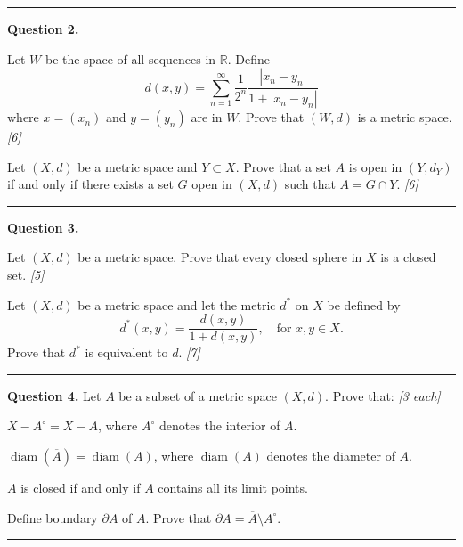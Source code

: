 \documentclass[11pt,a4paper]{article}
\newcommand{\pts}[1]{\hfill   \textit{[#1]}}
\begin{document}
\medskip\rule{\linewidth}{0.2pt}

\medskip


\noindent   \textbf{Question 2.}

\begin{parts}
  \item Let $W$ be the space of all sequences in $\mathbb{R}$. Define
  \[
  d(x, y) = \sum_{n=1}^\infty \frac{1}{2^n} \frac{|x_n - y_n|}{1 + |x_n - y_n|}
  \]
  where $x = (x_n)$ and $y = (y_n)$ are in $W$. Prove that $(W, d)$ is a metric space. \pts{6}
  \item Let $(X, d)$ be a metric space and $Y \subset X$. Prove that a set $A$ is open in $(Y, d_Y)$ if and only if there exists a set $G$ open in $(X, d)$ such that $A = G \cap Y$. \pts{6}
\end{parts}

\medskip\rule{\linewidth}{0.2pt}

\medskip


\noindent   \textbf{Question 3.}

\begin{parts}
  \item Let $(X, d)$ be a metric space. Prove that every closed sphere in $X$ is a closed set. \pts{5}
  \item Let $(X, d)$ be a metric space and let the metric $d^*$ on $X$ be defined by
  \[
  d^*(x, y) = \frac{d(x, y)}{1 + d(x, y)}, \quad  \text{for } x, y \in X.
  \]
  Prove that $d^*$ is equivalent to $d$. \pts{7}
\end{parts}

\medskip\rule{\linewidth}{0.2pt}

\medskip


\noindent   \textbf{Question 4.} Let $A$ be a subset of a metric space $(X, d)$. Prove that: \pts{3 each}

\begin{parts}
  \item $X - A^\circ = \overline{X - A}$, where $A^\circ$ denotes the interior of $A$.
  \item $\operatorname{diam}(\overline{A}) = \operatorname{diam}(A)$, where $\operatorname{diam}(A)$ denotes the diameter of $A$.
  \item $A$ is closed if and only if $A$ contains all its limit points.
  \item Define boundary $\partial A$ of $A$. Prove that $\partial A = \overline{A} \setminus A^\circ$.
\end{parts}

\medskip\rule{\linewidth}{0.2pt}
\end{document}
